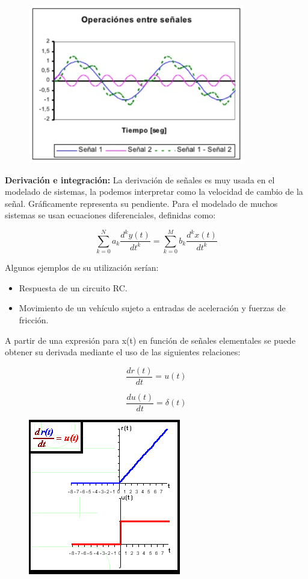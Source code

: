 \begin{figure}[h]
	\includegraphics[scale=0.6]{R}
	\centering
\end{figure}

\textbf{Derivación e integración:}
La derivación de señales es muy usada en el modelado de sistemas, la podemos interpretar como la velocidad de cambio de la señal. Gráficamente representa su pendiente. Para el modelado de muchos sistemas se usan ecuaciones diferenciales, definidas como:

\[
\sum_{k=0}^{N}a_{k} \frac{d^{k}y(t)}{dt^{k}}=\sum_{k=0}^{M}b_{k} \frac{d^{k}x(t)}{dt^{k}}
\]

Algunos ejemplos de su utilización serían:
\begin{itemize}
	\item Respuesta de un circuito RC.
	\item Movimiento de un vehículo sujeto a entradas de aceleración y fuerzas de fricción.
\end{itemize}
A partir de una expresión para x(t) en función de señales elementales se puede obtener su derivada mediante el uso de las siguientes relaciones:

\[
\frac{dr(t)}{dt} = u(t)
\]

\[
\frac{du(t)}{dt} = \delta(t)
\]

\begin{figure}[h]
	\centering
	\includegraphics[scale=0.6]{3}
	\caption[a]{}
	\label{fig:3}
\end{figure}


